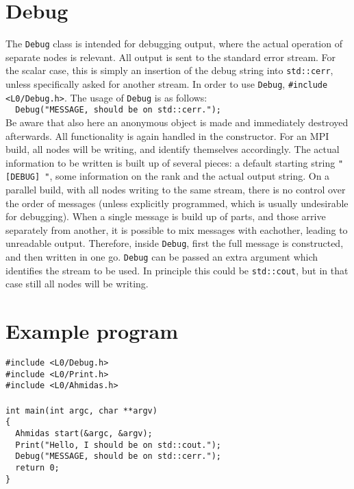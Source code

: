 \documentclass[a4paper,10pt]{article}
\begin{document}
\section{Debug}
The \verb|Debug| class is intended for debugging output, where the actual operation of separate nodes is relevant. All output is sent to the standard error stream. For the scalar case, this is simply an insertion of the debug string into \verb|std::cerr|, unless specifically asked for another stream. In order to use \verb|Debug|, \verb|#include <L0/Debug.h>|. The usage of \verb|Debug| is as follows:\\
\verb|  Debug("MESSAGE, should be on std::cerr.");|\\
Be aware that also here an anonymous object is made and immediately destroyed afterwards. All functionality is again handled in the constructor. For an MPI build, all nodes will be writing, and identify themselves accordingly. The actual information to be written is built up of several pieces: a default starting string \verb|"[DEBUG] "|, some information on the rank and the actual output string. On a parallel build, with all nodes writing to the same stream, there is no control over the order of messages (unless explicitly programmed, which is usually undesirable for debugging). When a single message is build up of parts, and those arrive separately from another, it is possible to mix messages with eachother, leading to unreadable output. Therefore, inside \verb|Debug|, first the full message is constructed, and then written in one go. \verb|Debug| can be passed an extra argument which identifies the stream to be used. In principle this could be \verb|std::cout|, but in that case still all nodes will be writing.
\section{Example program}
\verb|#include <L0/Debug.h>|\\
\verb|#include <L0/Print.h>|\\
\verb|#include <L0/Ahmidas.h>|\\
\verb||\\
\verb|int main(int argc, char **argv)|\\
\verb|{|\\
\verb|  Ahmidas start(&argc, &argv);|\\
\verb|  Print("Hello, I should be on std::cout.");|\\
\verb|  Debug("MESSAGE, should be on std::cerr.");|\\
\verb|  return 0;|\\
\verb|}|\\
\end{document}
